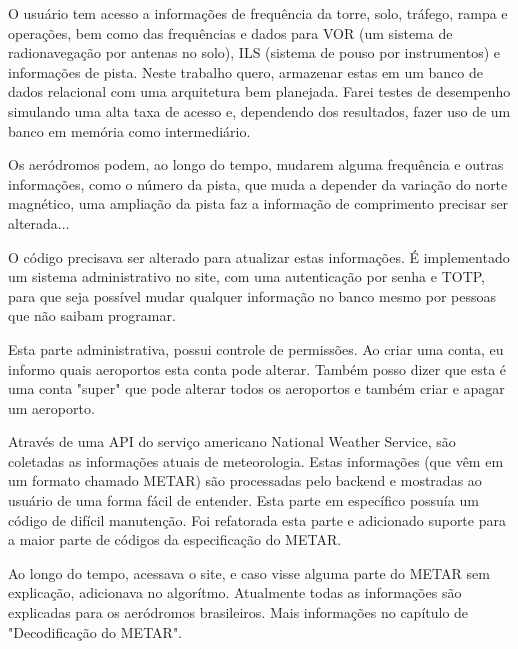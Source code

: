 O usuário tem acesso a informações de frequência da torre, solo, tráfego, rampa
e operações, bem como das frequências e dados para VOR (um sistema de radionavegação
por antenas no solo), ILS (sistema de pouso por instrumentos) e informações
de pista. Neste trabalho quero, armazenar estas
em um banco de dados relacional com uma arquitetura bem planejada. Farei testes
de desempenho simulando uma alta taxa de acesso e, dependendo dos resultados,
fazer uso de um banco em memória como intermediário. 

Os aeródromos podem, ao longo do tempo, mudarem alguma frequência e outras
informações, como o número da pista, que muda a depender da variação do norte magnético,
uma ampliação da pista faz a informação de comprimento precisar ser alterada...

O código precisava ser alterado para atualizar estas informações.
É implementado um sistema administrativo no site, com uma autenticação por
senha e TOTP, para que seja possível mudar qualquer informação no banco mesmo
por pessoas que não saibam programar.

Esta parte administrativa, possui controle de permissões. Ao criar uma
conta, eu informo quais aeroportos esta conta pode alterar. Também posso
dizer que esta é uma conta "super" que pode alterar todos os aeroportos
e também criar e apagar um aeroporto.

Através de uma API do serviço americano National Weather Service, são coletadas 
as informações atuais de meteorologia. Estas informações (que vêm em um formato
chamado METAR) são processadas pelo backend e mostradas ao usuário de uma forma 
fácil de entender. Esta parte em específico possuía um código de difícil manutenção.
Foi refatorada esta parte e adicionado suporte para a maior parte de códigos
da especificação do METAR.

Ao longo do tempo, acessava o site, e caso visse alguma parte do METAR sem explicação,
adicionava no algorítmo. Atualmente todas as informações são explicadas para
os aeródromos brasileiros. Mais informações no capítulo de "Decodificação do METAR".
